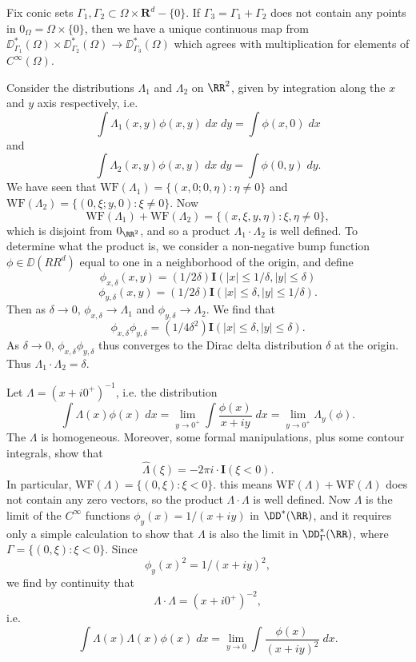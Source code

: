 \begin{theorem}
    Fix conic sets $\Gamma_1,\Gamma_2 \subset \Omega \times \mathbf{R}^d - \{ 0 \}$. If $\Gamma_3 = \Gamma_1 + \Gamma_2$ does not contain any points in $0_\Omega = \Omega \times \{ 0 \}$, then we have a unique continuous map from $\DD^*_{\Gamma_1}(\Omega) \times \DD^*_{\Gamma_2}(\Omega) \to \DD^*_{\Gamma_3}(\Omega)$ which agrees with multiplication for elements of $C^\infty(\Omega)$.
\end{theorem}

\begin{example}
    Consider the distributions $\Lambda_1$ and $\Lambda_2$ on $\RR^2$, given by integration along the $x$ and $y$ axis respectively, i.e.
    \[ \int \Lambda_1(x,y) \phi(x,y)\; dx\; dy = \int \phi(x,0)\; dx \]
    and
    \[ \int \Lambda_2(x,y) \phi(x,y)\; dx\; dy = \int \phi(0,y)\; dy. \]
    We have seen that $\text{WF}(\Lambda_1) = \{ (x,0;0,\eta) : \eta \neq 0 \}$ and $\text{WF}(\Lambda_2) = \{ (0,\xi;y,0) : \xi \neq 0 \}$. Now
    \[ \text{WF}(\Lambda_1) + \text{WF}(\Lambda_2) = \{ (x,\xi,y,\eta): \xi, \eta \neq 0 \}, \]
    which is disjoint from $0_{\RR^2}$, and so a product $\Lambda_1 \cdot \Lambda_2$ is well defined. To determine what the product is, we consider a non-negative bump function $\phi \in \DD(RR^d)$ equal to one in a neighborhood of the origin, and define
    \[ \phi_{x,\delta}(x,y) = (1/2\delta) \mathbf{I}(|x| \leq 1/\delta, |y| \leq \delta) \]
    \[ \phi_{y,\delta}(x,y) = (1/2\delta) \mathbf{I}(|x| \leq \delta, |y| \leq 1/\delta). \]
    Then as $\delta \to 0$, $\phi_{x,\delta} \to \Lambda_1$ and $\phi_{y,\delta} \to \Lambda_2$. We find that
    \[ \phi_{x,\delta} \phi_{y,\delta} = (1/4\delta^2) \mathbf{I}(|x| \leq \delta, |y| \leq \delta). \]
    As $\delta \to 0$, $\phi_{x,\delta} \phi_{y,\delta}$ thus converges to the Dirac delta distribution $\delta$ at the origin. Thus $\Lambda_1 \cdot \Lambda_2 = \delta$.
\end{example}

\begin{example}
    Let $\Lambda = (x + i0^+)^{-1}$, i.e. the distribution
    \[ \int \Lambda(x) \phi(x)\; dx = \lim_{y \to 0^+} \int \frac{\phi(x)}{x + iy}\; dx = \lim_{y \to 0^+} \Lambda_y(\phi). \]
    The $\Lambda$ is homogeneous. Moreover, some formal manipulations, plus some contour integrals, show that
    \[ \widehat{\Lambda}(\xi) = - 2 \pi i \cdot \mathbf{I}(\xi < 0). \]
    In particular, $\text{WF}(\Lambda) = \{ (0,\xi) : \xi < 0 \}$. this means $\text{WF}(\Lambda) + \text{WF}(\Lambda)$ does not contain any zero vectors, so the product $\Lambda \cdot \Lambda$ is well defined. Now $\Lambda$ is the limit of the $C^\infty$ functions $\phi_y(x) = 1/(x + iy)$ in $\DD^*(\RR)$, and it requires only a simple calculation to show that $\Lambda$ is also the limit in $\DD^*_\Gamma(\RR)$, where $\Gamma = \{ (0,\xi): \xi < 0 \}$. Since
    \[ \phi_y(x)^2 = 1/(x + iy)^2, \]
    we find by continuity that
    \[ \Lambda \cdot \Lambda = (x + i0^+)^{-2}, \]
    i.e.
    \[ \int \Lambda(x) \Lambda(x) \phi(x)\; dx = \lim_{y \to 0} \int \frac{\phi(x)}{(x + iy)^2}\; dx. \]
\end{example}

